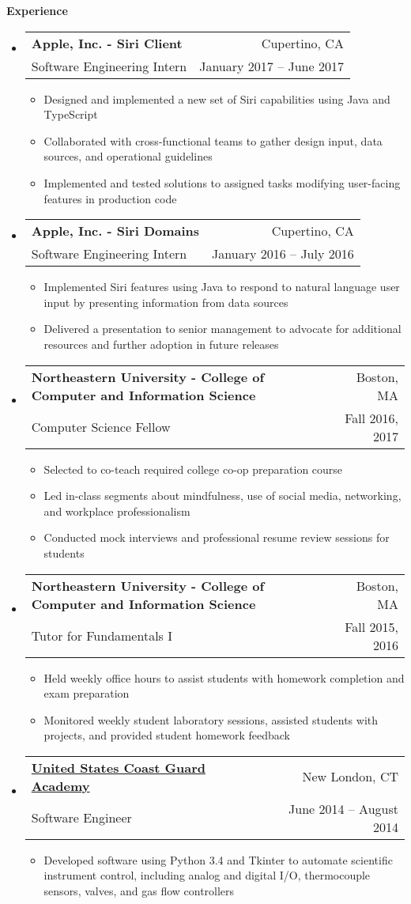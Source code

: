 \documentclass[letterpaper,10.8pt]{article}
\makeatletter
\newcommand{\resitem}[1]{\item #1 \vspace{-2pt}}
\newcommand{\resheading}[1]{{\large \colorbox{mygrey}{\begin{minipage}{\textwidth}{\textbf{#1 \vphantom{p\^{E}}}}\end{minipage}}}}
\newcommand{\ressubheading}[4]{
\begin{tabular*}{6.8in}{l@{\extracolsep{\fill}}r}
		\textbf{#1} & #2 \\
		\small{#3} & \small{#4} \\
\end{tabular*}\vspace{-6pt}}
\makeatother
\begin{document}
\resheading{Experience}
	\begin{itemize}[leftmargin=*]
		\item[]
			\ressubheading{Apple, Inc. - \small{Siri Client}}{Cupertino, CA}{Software Engineering Intern}{January 2017 -- June 2017}
			{\footnotesize
				\begin{itemize}
					\resitem{Designed and implemented a new set of Siri capabilities using Java and TypeScript}
					\resitem{Collaborated with cross-functional teams to gather design input, data sources, and operational guidelines}
					\resitem{Implemented and tested solutions to assigned tasks modifying user-facing features in production code}
				\end{itemize}}
		\item[]
			\ressubheading{Apple, Inc. - \small{Siri Domains}}{Cupertino, CA}{Software Engineering Intern}{January 2016 -- July 2016}
			{\footnotesize
				\begin{itemize}
					\resitem{Implemented Siri features using Java to respond to natural language user input by presenting information from data sources}
					\resitem{Delivered a presentation to senior management to advocate for additional resources and further adoption in future releases}
				\end{itemize}}
		\item[]
			\ressubheading{Northeastern University - \small{College of Computer and Information Science}}{Boston, MA}{Computer Science Fellow}{Fall 2016, 2017}
			{\footnotesize
				\begin{itemize}
					\resitem{Selected to co-teach required college co-op preparation course}
					\resitem{Led in-class segments about mindfulness, use of social media, networking, and workplace professionalism}
					\resitem{Conducted mock interviews and professional resume review sessions for students}
			\end{itemize}}
		\item[]
			\ressubheading{Northeastern University - \small{College of Computer and Information Science}}{Boston, MA}{Tutor for Fundamentals I}{Fall 2015, 2016}
			{\footnotesize
				\begin{itemize}
					\resitem{Held weekly office hours to assist students with homework completion and exam preparation}
					\resitem{Monitored weekly student laboratory sessions, assisted students with projects, and provided student homework feedback}
				\end{itemize}}
		\item[] 
			\ressubheading{\href{http://www.uscga.edu}{United States Coast Guard Academy}}{New London, CT}
				{Software Engineer}{June 2014 -- August 2014}
				{\footnotesize
				\begin{itemize}
					\resitem{Developed software using Python 3.4 and Tkinter to automate scientific instrument control, including analog and digital I/O, thermocouple sensors, valves, and gas flow controllers}
				\end{itemize}}
	\end{itemize} 
\end{document}
